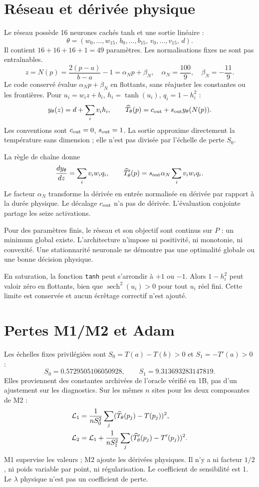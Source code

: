 \documentclass[11pt,a4paper]{article}
\begin{document}
\clearpage
\section{Réseau et dérivée physique}
\label{sec:reseau}
Le réseau possède 16 neurones cachés tanh et une sortie linéaire :
\[
\theta=(w_0,\ldots,w_{15},\,b_0,\ldots,b_{15},\,
v_0,\ldots,v_{15},\,d).
\]
Il contient $16+16+16+1=49$ paramètres. Les normalisations fixes ne sont
pas entraînables.
\[
z=N(p)=\frac{2(p-a)}{b-a}-1=\alpha_Np+\beta_N,\quad
\alpha_N=\frac{100}{9},\quad\beta_N=-\frac{11}{9}.
\]
Le code conservé évalue $\alpha_Np+\beta_N$ en flottants, sans réajuster
les constantes ou les frontières. Pour $u_i=w_iz+b_i$, $h_i=\tanh(u_i)$,
$q_i=1-h_i^2$ :
\[
y_\theta(z)=d+\sum_i v_ih_i,\qquad
\widehat T_\theta(p)=c_{\rm out}+s_{\rm out}y_\theta(N(p)).
\]
Les conventions sont $c_{\rm out}=0$, $s_{\rm out}=1$.
La sortie approxime directement la température sans dimension ; elle
n'est pas divisée par l'échelle de perte $S_0$.

La règle de chaîne donne
\[
\frac{dy_\theta}{dz}=\sum_i v_iw_iq_i,\qquad
\widehat T_\theta'(p)=s_{\rm out}\alpha_N\sum_i v_iw_iq_i.
\]
Le facteur $\alpha_N$ transforme la dérivée en entrée normalisée en
dérivée par rapport à la durée physique. Le décalage $c_{\rm out}$ n'a
pas de dérivée. L'évaluation conjointe partage les seize activations.

Pour des paramètres finis, le réseau et son objectif sont continus sur $P$ :
un minimum global existe. L'architecture n'impose ni positivité,
ni monotonie, ni convexité. Une stationnarité neuronale ne démontre
pas une optimalité globale ou une bonne décision physique.

En saturation, la fonction \texttt{tanh} peut s'arrondir à $+1$ ou $-1$.
Alors $1-h_i^2$ peut valoir zéro en flottants, bien que
$\operatorname{sech}^2(u_i)>0$ pour tout $u_i$ réel fini.
Cette limite est conservée et aucun écrêtage correctif n'est ajouté.

\clearpage
\section{Pertes M1/M2 et Adam}
\label{sec:pertes}
Les échelles fixes privilégiées sont $S_0=T(a)-T(b)>0$ et $S_1=-T'(a)>0$ :
\[
S_0=0.5729505106050928,\qquad S_1=9.313693283147819.
\]
Elles proviennent des constantes archivées de l'oracle vérifié en 1B,
pas d'un ajustement sur les diagnostics.
Sur les mêmes $n$ sites pour les deux composantes de M2 :
\begin{align*}
\mathcal L_1&=\frac1{nS_0^2}\sum_j(\widehat T_\theta(p_j)-T(p_j))^2,\\
\mathcal L_2&=\mathcal L_1+\frac1{nS_1^2}\sum_j(\widehat T_\theta'(p_j)-T'(p_j))^2.
\end{align*}
M1 supervise les valeurs ; M2 ajoute les dérivées physiques.
Il n'y a ni facteur $1/2$, ni poids variable par point, ni régularisation.
Le coefficient de sensibilité est 1. Le $\lambda$ physique n'est pas
un coefficient de perte.
\end{document}
